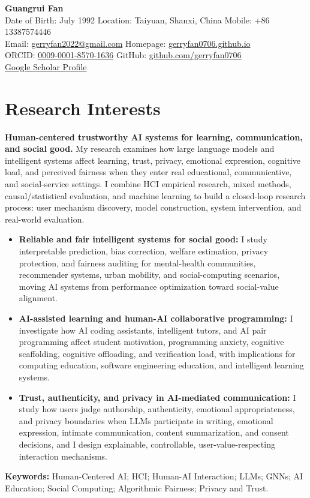 \documentclass[a4paper,10pt]{article}
\newcommand{\cvlabel}[1]{\textbf{#1}}
\begin{document}
\begin{center}
  {\LARGE\bfseries Guangrui Fan}\\[0.05em]
  Date of Birth: July 1992 \quad Location: Taiyuan, Shanxi, China \quad Mobile: +86 13387574446\\[0.15em]
  Email: \href{mailto:gerryfan2022@gmail.com}{gerryfan2022@gmail.com} \quad
  Homepage: \href{https://gerryfan0706.github.io}{gerryfan0706.github.io}\\[0.15em]
  ORCID: \href{https://orcid.org/0009-0001-8570-1636}{0009-0001-8570-1636} \quad
  GitHub: \href{https://github.com/gerryfan0706}{github.com/gerryfan0706}\\[0.15em]
  \href{https://scholar.google.com.hk/citations?user=GB4mzYsAAAAJ&hl=en}{Google Scholar Profile}
\end{center}

\section*{Research Interests}

\cvlabel{Human-centered trustworthy AI systems for learning, communication, and social good.}
My research examines how large language models and intelligent systems affect learning, trust, privacy, emotional expression, cognitive load, and perceived fairness when they enter real educational, communicative, and social-service settings. I combine HCI empirical research, mixed methods, causal/statistical evaluation, and machine learning to build a closed-loop research process: user mechanism discovery, model construction, system intervention, and real-world evaluation.

\begin{itemize}
  \item \cvlabel{Reliable and fair intelligent systems for social good:} I study interpretable prediction, bias correction, welfare estimation, privacy protection, and fairness auditing for mental-health communities, recommender systems, urban mobility, and social-computing scenarios, moving AI systems from performance optimization toward social-value alignment.
  \item \cvlabel{AI-assisted learning and human-AI collaborative programming:} I investigate how AI coding assistants, intelligent tutors, and AI pair programming affect student motivation, programming anxiety, cognitive scaffolding, cognitive offloading, and verification load, with implications for computing education, software engineering education, and intelligent learning systems.
  \item \cvlabel{Trust, authenticity, and privacy in AI-mediated communication:} I study how users judge authorship, authenticity, emotional appropriateness, and privacy boundaries when LLMs participate in writing, emotional expression, intimate communication, content summarization, and consent decisions, and I design explainable, controllable, user-value-respecting interaction mechanisms.
\end{itemize}
\cvlabel{Keywords:} Human-Centered AI; HCI; Human-AI Interaction; LLMs; GNNs; AI Education; Social Computing; Algorithmic Fairness; Privacy and Trust.
\end{document}
